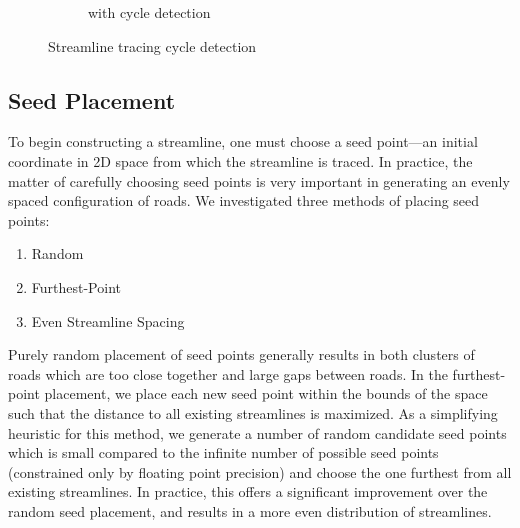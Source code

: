 \documentclass[twocolumn]{article}
\begin{document}
\begin{figure}[t!]
\begin{subfigure}[b]{2.4in}
        \caption{with cycle detection}
    \end{subfigure}
\caption{Streamline tracing cycle detection}
\label{fig:cycles}
\end{figure}

\subsection{Seed Placement}\label{seedpoints}
To begin constructing a streamline, one must choose a seed point—an initial
coordinate in 2D space from which the streamline is traced. In practice, the
matter of carefully choosing seed points is very important in generating an
evenly spaced configuration of roads. We investigated three methods of placing
seed points:
\begin{enumerate}
    \item Random
    \item Furthest-Point
    \item Even Streamline Spacing
\end{enumerate}
Purely random placement of seed points generally results in both clusters of
roads which are too close together and large gaps between roads. In the
furthest-point placement, we place each new seed point within the bounds of the
space such that the distance to all existing streamlines is maximized. As a
simplifying heuristic for this method, we generate a number of random candidate
seed points which is small compared to the infinite number of possible seed
points (constrained only by floating point precision) and choose the one
furthest from all existing streamlines. In practice, this offers a significant
improvement over the random seed placement, and results in a more even
distribution of streamlines.
\end{document}
